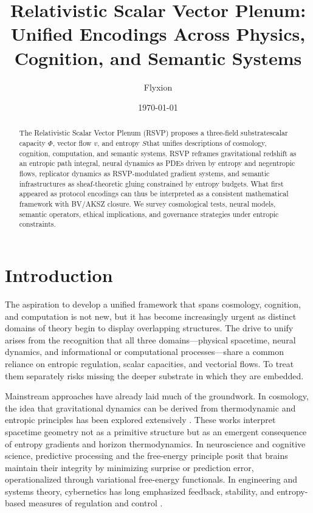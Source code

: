\documentclass[12pt]{article}
\title{Relativistic Scalar Vector Plenum: Unified Encodings Across Physics, Cognition, and Semantic Systems}
\author{Flyxion}
\date{\today}
\begin{document}
\maketitle

\begin{abstract}
The Relativistic Scalar Vector Plenum (RSVP) proposes a three-field substrate\emdash{}scalar capacity $\Phi$, vector flow $v$, and entropy $S$\emdash{}that unifies descriptions of cosmology, cognition, computation, and semantic systems. RSVP reframes gravitational redshift as an entropic path integral, neural dynamics as PDEs driven by entropy and negentropic flows, replicator dynamics as RSVP-modulated gradient systems, and semantic infrastructures as sheaf-theoretic gluing constrained by entropy budgets. What first appeared as protocol encodings can thus be interpreted as a consistent mathematical framework with BV/AKSZ closure. We survey cosmological tests, neural models, semantic operators, ethical implications, and governance strategies under entropic constraints.
\end{abstract}


\section{Introduction}

The aspiration to develop a unified framework that spans cosmology, cognition, and computation is not new, but it has become increasingly urgent as distinct domains of theory begin to display overlapping structures. The drive to unify arises from the recognition that all three domains---physical spacetime, neural dynamics, and informational or computational processes---share a common reliance on entropic regulation, scalar capacities, and vectorial flows. To treat them separately risks missing the deeper substrate in which they are embedded.  

Mainstream approaches have already laid much of the groundwork. In cosmology, the idea that gravitational dynamics can be derived from thermodynamic and entropic principles has been explored extensively \cite{Jacobson:1995ab,Verlinde:2010hp,Padmanabhan:2009vy,Carney2022}. These works interpret spacetime geometry not as a primitive structure but as an emergent consequence of entropy gradients and horizon thermodynamics. In neuroscience and cognitive science, predictive processing and the free-energy principle \cite{Friston:2009ze,Hohwy2013,ParrPezzuloFriston2022} posit that brains maintain their integrity by minimizing surprise or prediction error, operationalized through variational free-energy functionals. In engineering and systems theory, cybernetics has long emphasized feedback, stability, and entropy-based measures of regulation and control \cite{Wiener1948,Ashby1956}.  
\end{document}
